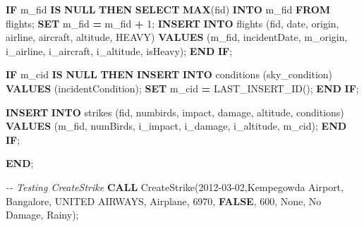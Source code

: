 \documentclass[
]{article}
\newenvironment{Shaded}{\begin{snugshade}}{\end{snugshade}}
\newcommand{\CommentTok}[1]{\textcolor[rgb]{0.56,0.35,0.01}{\textit{#1}}}
\newcommand{\ControlFlowTok}[1]{\textcolor[rgb]{0.13,0.29,0.53}{\textbf{#1}}}
\newcommand{\DataTypeTok}[1]{\textcolor[rgb]{0.13,0.29,0.53}{#1}}
\newcommand{\DecValTok}[1]{\textcolor[rgb]{0.00,0.00,0.81}{#1}}
\newcommand{\FunctionTok}[1]{\textcolor[rgb]{0.13,0.29,0.53}{\textbf{#1}}}
\newcommand{\KeywordTok}[1]{\textcolor[rgb]{0.13,0.29,0.53}{\textbf{#1}}}
\newcommand{\NormalTok}[1]{#1}
\newcommand{\OperatorTok}[1]{\textcolor[rgb]{0.81,0.36,0.00}{\textbf{#1}}}
\newcommand{\StringTok}[1]{\textcolor[rgb]{0.31,0.60,0.02}{#1}}
\begin{document}
\begin{Shaded}
\begin{Highlighting}[]
    \ControlFlowTok{IF}\NormalTok{ m\_fid }\KeywordTok{IS} \KeywordTok{NULL} \ControlFlowTok{THEN}
        \KeywordTok{SELECT} \FunctionTok{MAX}\NormalTok{(fid) }\KeywordTok{INTO}\NormalTok{ m\_fid }\KeywordTok{FROM}\NormalTok{ flights;}
        \KeywordTok{SET}\NormalTok{ m\_fid }\OperatorTok{=}\NormalTok{ m\_fid }\OperatorTok{+} \DecValTok{1}\NormalTok{;}
        \KeywordTok{INSERT} \KeywordTok{INTO}\NormalTok{ flights (fid, }\DataTypeTok{date}\NormalTok{, origin, airline, aircraft, altitude, HEAVY) }
        \KeywordTok{VALUES}\NormalTok{ (m\_fid, incidentDate, m\_origin, i\_airline, i\_aircraft, i\_altitude, isHeavy);}
    \ControlFlowTok{END} \ControlFlowTok{IF}\NormalTok{;}

    \ControlFlowTok{IF}\NormalTok{ m\_cid }\KeywordTok{IS} \KeywordTok{NULL} \ControlFlowTok{THEN}
        \KeywordTok{INSERT} \KeywordTok{INTO}\NormalTok{ conditions (sky\_condition) }\KeywordTok{VALUES}\NormalTok{ (incidentCondition);}
        \KeywordTok{SET}\NormalTok{ m\_cid }\OperatorTok{=}\NormalTok{ LAST\_INSERT\_ID();}
    \ControlFlowTok{END} \ControlFlowTok{IF}\NormalTok{;}
    
     \KeywordTok{INSERT} \KeywordTok{INTO}\NormalTok{ strikes (fid, numbirds, impact, damage, altitude, conditions) }
     \KeywordTok{VALUES}\NormalTok{ (m\_fid, numBirds, i\_impact, i\_damage, i\_altitude, m\_cid);}
    \ControlFlowTok{END} \ControlFlowTok{IF}\NormalTok{;}
    
\ControlFlowTok{END}\NormalTok{;}
\end{Highlighting}
\end{Shaded}

\begin{Shaded}
\begin{Highlighting}[]
\CommentTok{{-}{-} Testing CreateStrike}
\KeywordTok{CALL}\NormalTok{ CreateStrike(}\StringTok{\textquotesingle{}2012{-}03{-}02\textquotesingle{}}\NormalTok{,}\StringTok{\textquotesingle{}Kempegowda Airport\textquotesingle{}}\NormalTok{, }\StringTok{\textquotesingle{}Bangalore\textquotesingle{}}\NormalTok{, }\StringTok{\textquotesingle{}UNITED AIRWAYS\textquotesingle{}}\NormalTok{, }\StringTok{\textquotesingle{}Airplane\textquotesingle{}}\NormalTok{, }\DecValTok{6970}\NormalTok{, }\KeywordTok{FALSE}\NormalTok{, }\DecValTok{600}\NormalTok{, }\StringTok{\textquotesingle{}None\textquotesingle{}}\NormalTok{, }\StringTok{\textquotesingle{}No Damage\textquotesingle{}}\NormalTok{, }\StringTok{\textquotesingle{}Rainy\textquotesingle{}}\NormalTok{);}
\end{Highlighting}
\end{Shaded}
\end{document}
